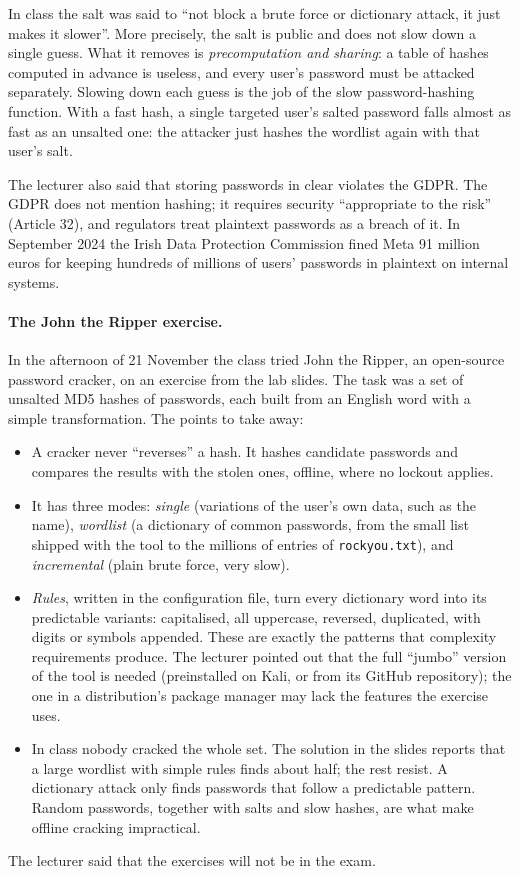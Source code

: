 \begin{remark}
In class the salt was said to \enquote{not block a brute force or dictionary attack, it just makes it slower}. More precisely, the salt is public and does not slow down a single guess. What it removes is \emph{precomputation and sharing}: a table of hashes computed in advance is useless, and every user's password must be attacked separately. Slowing down each guess is the job of the slow password-hashing function. With a fast hash, a single targeted user's salted password falls almost as fast as an unsalted one: the attacker just hashes the wordlist again with that user's salt.

The lecturer also said that storing passwords in clear violates the GDPR. The GDPR does not mention hashing; it requires security \enquote{appropriate to the risk} (Article 32), and regulators treat plaintext passwords as a breach of it. In September 2024 the Irish Data Protection Commission fined Meta 91 million euros for keeping hundreds of millions of users' passwords in plaintext on internal systems.
\end{remark}

\paragraph{The John the Ripper exercise.} In the afternoon of 21 November the class tried John the Ripper, an open-source password cracker, on an exercise from the lab slides. The task was a set of unsalted MD5 hashes of passwords, each built from an English word with a simple transformation. The points to take away:
\begin{itemize}
    \item A cracker never \enquote{reverses} a hash. It hashes candidate passwords and compares the results with the stolen ones, offline, where no lockout applies.
    \item It has three modes: \emph{single} (variations of the user's own data, such as the name), \emph{wordlist} (a dictionary of common passwords, from the small list shipped with the tool to the millions of entries of \texttt{rockyou.txt}), and \emph{incremental} (plain brute force, very slow).
    \item \emph{Rules}, written in the configuration file, turn every dictionary word into its predictable variants: capitalised, all uppercase, reversed, duplicated, with digits or symbols appended. These are exactly the patterns that complexity requirements produce. The lecturer pointed out that the full \enquote{jumbo} version of the tool is needed (preinstalled on Kali, or from its GitHub repository); the one in a distribution's package manager may lack the features the exercise uses.
    \item In class nobody cracked the whole set. The solution in the slides reports that a large wordlist with simple rules finds about half; the rest resist. A dictionary attack only finds passwords that follow a predictable pattern. Random passwords, together with salts and slow hashes, are what make offline cracking impractical.
\end{itemize}
The lecturer said that the exercises will not be in the exam.

